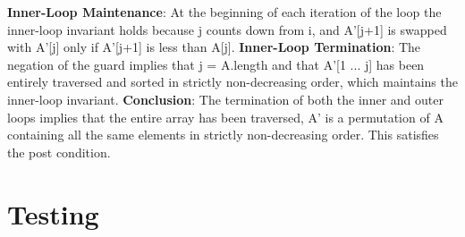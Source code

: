 \documentclass[onecolumn, 12pt, article]{IEEEtran}
\numberwithin{case}{problem}
\numberwithin{condition}{problem}
\numberwithin{condition}{subsection}
\numberwithin{definition}{section}
\theoremstyle{remark}
\numberwithin{question}{problem}
\theoremstyle{plain}
\numberwithin{answer}{problem}
\numberwithin{solution}{section}
\numberwithin{equation}{section}%
\begin{document}
\textbf{Inner-Loop Maintenance}: At the beginning of each iteration of the loop the inner-loop invariant holds because j counts down from i, and A'[j+1] is swapped with A'[j] only if A'[j+1] is less than A[j].
\newline
\textbf{Inner-Loop Termination}: The negation of the guard implies that j = A.length and that A'[1 ... j] has been entirely traversed and sorted in strictly non-decreasing order, which maintains the inner-loop invariant. 
\newline
\newline
\textbf{Conclusion}: The termination of both the inner and outer loops implies that the entire array has been traversed, A' is a permutation of A containing all the same elements in strictly non-decreasing order. This satisfies the post condition.

\section{Testing}
\end{document}
